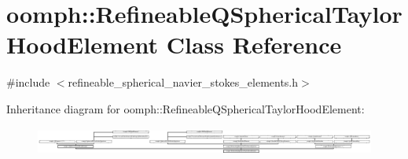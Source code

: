 \hypertarget{classoomph_1_1RefineableQSphericalTaylorHoodElement}{}\section{oomph\+:\+:Refineable\+Q\+Spherical\+Taylor\+Hood\+Element Class Reference}
\label{classoomph_1_1RefineableQSphericalTaylorHoodElement}


{\ttfamily \#include $<$refineable\+\_\+spherical\+\_\+navier\+\_\+stokes\+\_\+elements.\+h$>$}

Inheritance diagram for oomph\+:\+:Refineable\+Q\+Spherical\+Taylor\+Hood\+Element\+:\begin{figure}[H]
\begin{center}
\leavevmode
\includegraphics[height=0.928690cm]{classoomph_1_1RefineableQSphericalTaylorHoodElement}
\end{center}
\end{figure}

